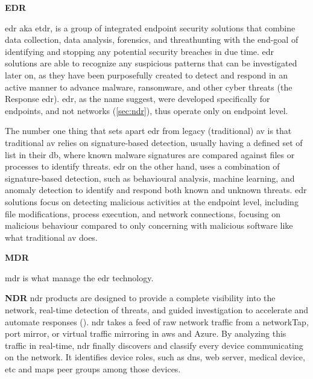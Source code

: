 \begin{multicols}{2}
      \textbf{EDR}

      \acrshort{edr} \acrshort{aka} \acrshort{etdr}, is a group of integrated endpoint security solutions that combine data collection,
      data analysis, forensics, and \gls{threathunting} with the end-goal of identifying and stopping any potential security breaches in due
      time. \acrshort{edr} solutions are able to recognize any suspicious patterns that can be investigated later on, as they have been
      purposefully created to detect and respond in an active manner to advance malware, ransomware, and other cyber threats (the Response
      \acrshort{edr}). \acrshort{edr}, as the name suggest, were developed specifically for endpoints, and not networks (\ref{sec:ndr}), thus
      operate only on endpoint level.

      The number one thing that sets apart \acrshort{edr} from legacy (traditional) \acrshort{av} is that traditional \acrshort{av} relies on
      signature-based detection, usually having a defined set of list in their \acrshort{db}, where known malware signatures are compared
      against files or processes to identify threats. \acrshort{edr} on the other hand, uses a combination of signature-based detection, such
      as behavioural analysis, machine learning, and anomaly detection to identify and respond both known and unknown threats. \acrshort{edr}
      solutions focus on detecting malicious activities at the endpoint level, including file modifications, process execution, and network
      connections, focusing on malicious behaviour compared to only concerning with malicious software like what traditional \acrshort{av} does.

      \textbf{MDR}

      \acrshort{mdr} is what manage the \acrshort{edr} technology.

      \textbf{NDR} \label{sec:ndr}
      \acrshort{ndr} products are designed to provide a complete visibility into the network, real-time detection of threats, and guided
      investigation to accelerate and automate responses (\textit{\cite{sentinelOneNDR}}). \acrshort{ndr} takes a feed of raw network traffic
      from a \gls{networkTap}, port mirror, or virtual traffic mirroring in \acrshort{aws} and Azure. By analyzing this traffic in real-time,
      \acrshort{ndr} finally discovers and classify every device communicating on the network. It identifies device roles, such as \acrshort{dns},
      web server, medical device, \acrshort{etc} and maps peer groups among those devices.


\end{multicols}
